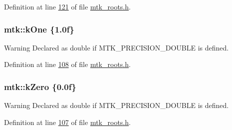 Definition at line \hyperlink{mtk__roots_8h_source_l00121}{121} of file \hyperlink{mtk__roots_8h_source}{mtk\-\_\-roots.\-h}.

\hypertarget{group__c01-roots_ga26407c24d43b6b95480943340d285c71}{
\subsubsection[{k\-One}]{\setlength{\rightskip}{0pt plus 5cm}mtk\-::k\-One \{1.\-0f\}}}\label{group__c01-roots_ga26407c24d43b6b95480943340d285c71}
\begin{DoxyWarning}{Warning}
Declared as double if M\-T\-K\-\_\-\-P\-R\-E\-C\-I\-S\-I\-O\-N\-\_\-\-D\-O\-U\-B\-L\-E is defined. 
\end{DoxyWarning}


Definition at line \hyperlink{mtk__roots_8h_source_l00108}{108} of file \hyperlink{mtk__roots_8h_source}{mtk\-\_\-roots.\-h}.

\hypertarget{group__c01-roots_ga59a451a5fae30d59649bcda274fea271}{
\subsubsection[{k\-Zero}]{\setlength{\rightskip}{0pt plus 5cm}mtk\-::k\-Zero \{0.\-0f\}}}\label{group__c01-roots_ga59a451a5fae30d59649bcda274fea271}
\begin{DoxyWarning}{Warning}
Declared as double if M\-T\-K\-\_\-\-P\-R\-E\-C\-I\-S\-I\-O\-N\-\_\-\-D\-O\-U\-B\-L\-E is defined. 
\end{DoxyWarning}


Definition at line \hyperlink{mtk__roots_8h_source_l00107}{107} of file \hyperlink{mtk__roots_8h_source}{mtk\-\_\-roots.\-h}.

